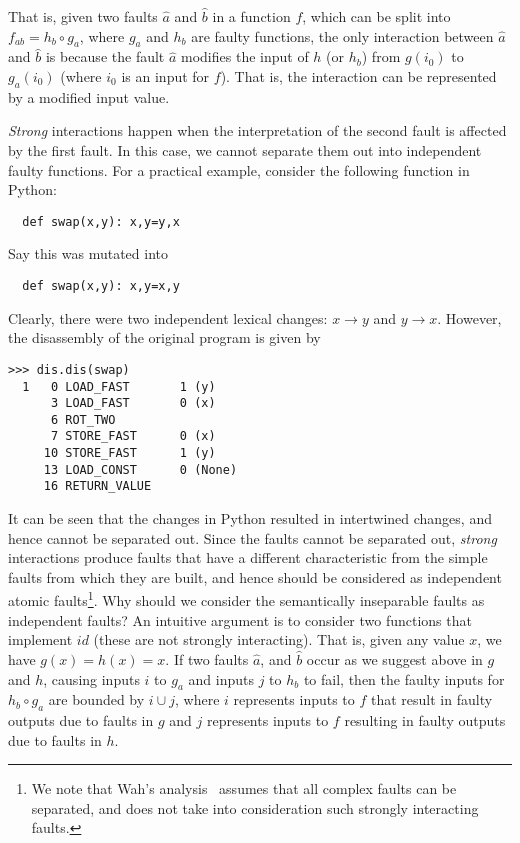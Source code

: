 \documentclass[preprint,nonatbib]{sigplanconf}\usepackage[]{graphicx}\usepackage[]{color}
\begin{document}
That is, given two faults $\hat{a}$ and $\hat{b}$ in a function $f$, which
can be split into $f_{ab} =  h_{b} \circ g_{a}$, where $g_{a}$ and $h_{b}$
are faulty functions, the only interaction between $\hat{a}$ and $\hat{b}$ is
because the fault $\hat{a}$ modifies the input of $h$ (or $h_{b}$) from $g(i_0)$
to $g_{a}(i_0)$ (where $i_0$ is an input for $f$). That is, the interaction
can be represented by a modified input value.

\emph{Strong} interactions happen when the interpretation of the second
fault is affected by the first fault. In this case, we cannot separate them
out into independent faulty functions.
For a practical example, consider the following function in Python:

\begin{lstlisting}
  def swap(x,y): x,y=y,x
\end{lstlisting}
Say this was mutated into
\begin{lstlisting}
  def swap(x,y): x,y=x,y
\end{lstlisting}
Clearly, there were two independent lexical changes: $x \rightarrow y$
and $y \rightarrow x$. However, the
disassembly of the original program is given by
\begin{lstlisting}
>>> dis.dis(swap)
  1   0 LOAD_FAST       1 (y)
      3 LOAD_FAST       0 (x)
      6 ROT_TWO
      7 STORE_FAST      0 (x)
     10 STORE_FAST      1 (y)
     13 LOAD_CONST      0 (None)
     16 RETURN_VALUE
\end{lstlisting}
It can be seen that the changes in Python resulted in intertwined changes,
and hence cannot be separated out.
Since the faults cannot be separated out, \emph{strong} interactions produce
faults that have a different characteristic from the simple faults from which
they are built, and hence should be considered as independent atomic
faults\footnote{We note that Wah's analysis~\cite{wah2000atheoretical} assumes
that all complex faults can be separated, and does not take into consideration
such strongly interacting faults.}.
Why should we consider the semantically inseparable faults as independent
faults? An intuitive argument is to consider two functions that
implement $id$ (these are not strongly interacting).
That is, given any value $x$, we have $g(x) = h(x) = x$. If two faults $\hat{a}$, and
$\hat{b}$ occur as we suggest above in $g$ and $h$, causing inputs $i$ to $g_a$
and inputs $j$ to $h_b$ to fail, then the faulty inputs for $h_b \circ g_a$ are
bounded by $i \cup j$, where $i$ represents inputs to $f$ that result in faulty
outputs due to faults in $g$ and $j$ represents inputs to $f$ resulting in faulty
outputs due to faults in $h$.
\end{document}
